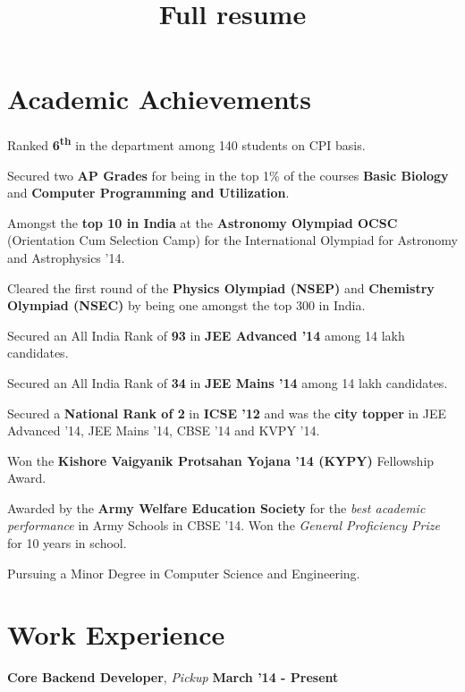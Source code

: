 \documentclass[11pt]{resume}
\title{Full resume}
\newcommand{\memph}[1]{#1}
\begin{document}
\vspace*{20mm}
\vspace{-2em}
\begin{resume}

\section{\mysidestyle Academic Achievements}
\begin{list2}
\item Ranked \textbf {6\textsuperscript{th}} in the department among 140 students on CPI basis. 
\item Secured two \textbf {AP Grades} for being in the top 1\% of the courses \textbf{Basic Biology} and \textbf{Computer Programming and Utilization}.
\item Amongst the \textbf{top 10 in India} at the \textbf {Astronomy Olympiad OCSC} (Orientation Cum Selection Camp) for the International Olympiad for Astronomy and Astrophysics '14.
\item Cleared the first round of the \textbf{Physics Olympiad (NSEP)} and \textbf{Chemistry Olympiad (NSEC)} by being one amongst the top 300 in India.
\item Secured an All India Rank of \textbf{93} in \textbf{JEE Advanced '14} among 14 lakh candidates.
\item Secured an All India Rank of \textbf{34} in \textbf{JEE Mains '14} among 14 lakh candidates.
\item Secured a \textbf{National Rank of 2} in \textbf{ICSE '12} and was the \textbf{city topper} in  JEE Advanced '14, JEE Mains '14, CBSE '14 and KVPY '14.
\item Won the \textbf {Kishore Vaigyanik Protsahan Yojana '14 (KYPY)} Fellowship Award.
\item Awarded by the \textbf {Army Welfare Education Society} for the \textit{best academic performance} in Army Schools in CBSE '14. Won the \textit{General Proficiency Prize} for 10 years in school. 
\item \memph Pursuing a Minor Degree in Computer Science and Engineering.
\end{list2}

\section{\mysidestyle Work Experience}
\textbf{Core Backend Developer}, \textsl{Pickup} \hfill \textbf{March '14 - Present}


\end{resume}
\end{document}
